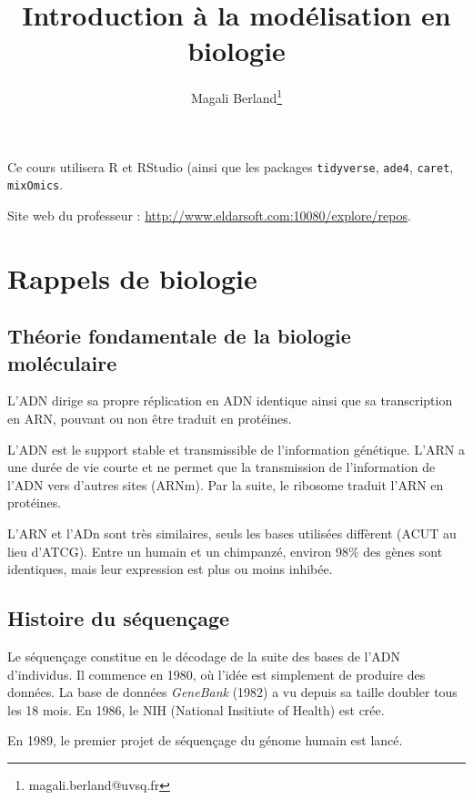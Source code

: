 \documentclass{article}
\title{Introduction à la modélisation en biologie}
\author{Magali Berland\footnote{magali.berland@uvsq.fr}}
\date{}
\begin{document}
\maketitle
\tableofcontents
\newpage

Ce cours utilisera R et RStudio (ainsi que les packages \texttt{tidyverse}, \texttt{ade4}, \texttt{caret}, \texttt{mixOmics}.

Site web du professeur : 
\url{http://www.eldarsoft.com:10080/explore/repos}.

\section{Rappels de biologie}
\subsection{Théorie fondamentale de la biologie moléculaire}

L'ADN dirige sa propre réplication en ADN identique ainsi que sa transcription en ARN, pouvant ou non être traduit en protéines.

L'ADN est le support stable et transmissible de l'information génétique. L'ARN a une durée de vie courte et ne permet que la transmission de l'information de l'ADN vers d'autres sites (ARNm). Par la suite, le ribosome traduit l'ARN en protéines.

L'ARN et l'ADn sont très similaires, seuls les bases utilisées diffèrent (ACUT au lieu d'ATCG). Entre un humain et un chimpanzé, environ 98\% des gènes sont identiques, mais leur expression est plus ou moins inhibée.

\subsection{Histoire du séquençage}
Le séquençage constitue en le décodage de la suite des bases de l'ADN d'individus. Il commence en 1980, où l'idée est simplement de produire des données. La base de données \emph{GeneBank} (1982) a vu depuis sa taille doubler tous les 18 mois. En 1986, le NIH (National Insitiute of Health) est crée.

En 1989, le premier projet de séquençage du génome humain est lancé.
\end{document}
